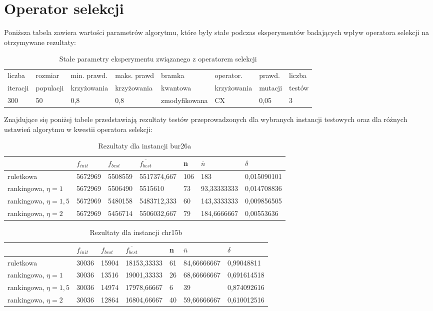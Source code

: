 \section{Operator selekcji}
Poniższa tabela zawiera wartości parametrów algorytmu, które były stałe podczas eksperymentów badających wpływ operatora selekcji na otrzymywane rezultaty:

\begin{table}[H]
\label{T5_params}
\begin{tabular}{l l l l l l l l}
\hline
liczba & rozmiar & min. prawd. & maks. prawd & bramka & operator. & prawd. & liczba \\
iteracji & populacji & krzyżowania & krzyżowania & kwantowa & krzyżowania & mutacji & testów \\
\hline
300 & 50 & 0,8 & 0,8 & zmodyfikowana & CX & 0,05 & 3 \\
\hline
\end{tabular}
\caption{Stałe parametry eksperymentu związanego z operatorem selekcji}
\end{table}

Znajdujące się poniżej tabele przedstawiają rezultaty testów przeprowadzonych dla wybranych instancji testowych oraz dla różnych ustawień algorytmu w kwestii operatora selekcji:

\begin{table}[H]
\label{T5_bur26a}
\begin{tabular}{l l l l l l l}
\hline
 & $f_{init}$ & $f_{best}$ & $\overline{f_{best}}$ & n & $\overline{n}$ & $\delta$ \\
\hline
ruletkowa & 5672969 & 5508559 & 5517374,667 & 106 & 183 & 0,015090101\\
rankingowa, $\eta = 1$ & 5672969 & 5506490 & 5515610 & 73 & 93,33333333 & 0,014708836\\
rankingowa, $\eta = 1,5$ & 5672969 & 5480158 & 5483712,333 & 60 & 143,3333333 & 0,009856505\\
rankingowa, $\eta = 2$ & 5672969 & 5456714 & 5506032,667 & 79 & 184,6666667 & 0,00553636\\
\hline
\end{tabular}
\caption{Rezultaty dla instancji bur26a}
\end{table}

\begin{table}[H]
\label{T5_chr15b}
\begin{tabular}{l l l l l l l}
\hline
 & $f_{init}$ & $f_{best}$ & $\overline{f_{best}}$ & n & $\overline{n}$ & $\delta$ \\
\hline
ruletkowa & 30036 & 15904 & 18153,33333 & 61 & 84,66666667 & 0,99048811\\
rankingowa, $\eta = 1$ & 30036 & 13516 & 19001,33333 & 26 & 68,66666667 & 0,691614518\\
rankingowa, $\eta = 1,5$ & 30036 & 14974 & 17978,66667 & 6 & 39 & 0,874092616\\
rankingowa, $\eta = 2$ & 30036 & 12864 & 16804,66667 & 40 & 59,66666667 & 0,610012516\\
\hline
\end{tabular}
\caption{Rezultaty dla instancji chr15b}
\end{table}

